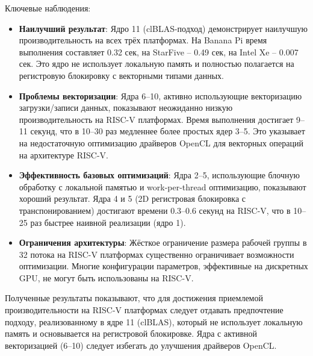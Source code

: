 Ключевые наблюдения:
\begin{itemize}
    \item \textbf{Наилучший результат}: Ядро 11 (clBLAS-подход) демонстрирует наилучшую производительность на всех трёх платформах. На Banana Pi время выполнения составляет 0.32 сек, на StarFive -- 0.49 сек, на Intel Xe -- 0.007 сек. Это ядро не использует локальную память и полностью полагается на регистровую блокировку с векторными типами данных.
    
    \item \textbf{Проблемы векторизации}: Ядра 6--10, активно использующие векторизацию загрузки/записи данных, показывают неожиданно низкую производительность на RISC-V платформах. Время выполнения достигает 9--11 секунд, что в 10--30 раз медленнее более простых ядер 3--5. Это указывает на недостаточную оптимизацию драйверов OpenCL для векторных операций на архитектуре RISC-V.
    
    \item \textbf{Эффективность базовых оптимизаций}: Ядра 2--5, использующие блочную обработку с локальной памятью и work-per-thread оптимизацию, показывают хороший результат. Ядра 4 и 5 (2D регистровая блокировка с транспонированием) достигают времени 0.3--0.6 секунд на RISC-V, что в 10--25 раз быстрее наивной реализации (ядро 1).
    
    \item \textbf{Ограничения архитектуры}: Жёсткое ограничение размера рабочей группы в 32 потока на RISC-V платформах существенно ограничивает возможности оптимизации. Многие конфигурации параметров, эффективные на дискретных GPU, не могут быть использованы на RISC-V.
\end{itemize}

Полученные результаты показывают, что для достижения приемлемой производительности на RISC-V платформах следует отдавать предпочтение подходу, реализованному в ядре 11 (clBLAS), который не использует локальную память и основывается на регистровой блокировке. Ядра с активной векторизацией (6--10) следует избегать до улучшения драйверов OpenCL.